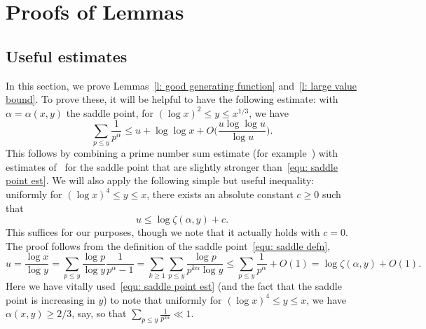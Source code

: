 \documentclass[a4paper,12pt,reqno]{amsart}
\begin{document}
\section{Proofs of Lemmas}\label{s:proof of lemmas}

\subsection{Useful estimates} 
In this section, we prove Lemmas~\ref{l: good generating function} and~\ref{l: large value bound}. To prove these, it will be helpful to have the following estimate: with $\alpha = \alpha (x,y)$ the saddle point, for $(\log x)^2 \leq y \leq x^{1/3}$, we have
\begin{equation}\label{equ: prime sum}
\sum_{p \leq y} \frac{1}{p^{\alpha }} \leq u + \log \log x + O \biggl( \frac{u \log \log u}{\log u} \biggr) .
\end{equation}
This follows by combining a prime number sum estimate (for example~\cite[Lemma~7.4]{MV2007}) with estimates of~\citet[Lemmas~2 and~3]{HildTen86} for the saddle point that are slightly stronger than~\eqref{equ: saddle point est}. We will also apply the following simple but useful inequality: uniformly for $(\log x)^4 \leq y \leq x$, there exists an absolute constant $c \geq 0$ such that
\begin{equation}\label{equ: u upper bound log zeta}
u \leq \log \zeta (\alpha, y) + c.
\end{equation}
This suffices for our purposes, though we note that it actually holds with $c = 0$. The proof follows from the definition of the saddle point~\eqref{equ: saddle defn},
\[
u = \frac{\log x}{\log y} = \sum_{p \leq y} \frac{\log p}{\log y} \frac{1}{p^{\alpha} - 1} = \sum_{k \geq 1} \sum_{p \leq y} \frac{\log p}{p^{k \alpha} \log y} \leq \sum_{p \leq y} \frac{1}{p^\alpha} + O(1) = \log \zeta(\alpha, y) + O(1).
\]
Here we have vitally used~\eqref{equ: saddle point est} (and the fact that the saddle point is increasing in $y$) to note that uniformly for $(\log x)^4 \leq y \leq x$, we have $\alpha(x,y) \geq 2/3$, say, so that $\sum_{p \leq y} \frac{1}{p^{2\alpha}} \ll 1$.
\end{document}
